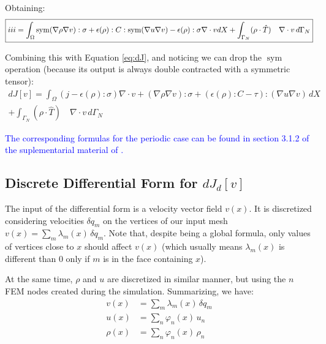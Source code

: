 \documentclass[11pt]{article}
\DeclareMathOperator{\sym}{sym}
\newcommand{\RNum}[1]{\uppercase\expandafter{\romannumeral #1\relax}}
\newcommand{\blue}{\textcolor{blue}}
\begin{document}
Obtaining:
\begin{equation}
  \boxed{\RNum{3} =
  \int_{\Omega} \sym(\nabla \rho \nabla v):\sigma + \epsilon(\rho):C:\sym(\nabla u \nabla v) - \epsilon(\rho): \sigma \nabla \cdot v  dX + \int_{\Gamma_{N}} (\rho \cdot \hat T) \quad \nabla \cdot v\, d\Gamma_{N}}
  \label{eq:IIIcomputation}
\end{equation}

Combining this with Equation \ref{eq:dJ}, and noticing we can drop the $\sym$ operation (because its output is always double contracted with a symmetric tensor):
\begin{multline}
  \boxed{dJ[v] = \int_{\Omega} (j - \epsilon(\rho): \sigma)\nabla \cdot v + (\nabla \rho \nabla v):\sigma + (\epsilon(\rho):C - \tau) : (\nabla u \nabla v) \, dX } \\ \boxed{+ \int_{\Gamma_{N}} (\rho \cdot \hat T) \quad \nabla \cdot v\, d\Gamma_{N}  }
  \label{eq:completedJ}
\end{multline}

\blue{The corresponding formulas for the periodic case can be found in section 3.1.2 of the suplementarial material of \cite{panetta2017}.}

\subsection{Discrete Differential Form for $dJ_d[v]$}

The input of the differential form is a velocity vector field $v(x)$. It is discretized considering velocities $\delta q_m$ on the vertices of our input mesh $v(x) = \sum_m \lambda_m(x) \, \delta q_m$. Note that, despite being a global formula, only values of vertices close to $x$ should affect $v(x)$ (which usually means $\lambda_m(x)$ is different than $0$ only if $m$ is in the face containing $x$).

At the same time, $\rho$ and $u$ are discretized in similar manner, but using the $n$ FEM nodes created during the simulation. Summarizing, we have:
\begin{align*}
    v(x) &= \sum_m \lambda_m(x) \, \delta q_m\\
    u(x) &= \sum_n \varphi_n(x) \, u_n\\
    \rho(x) &= \sum_n \varphi_n(x) \, \rho_n
\end{align*}
\end{document}
